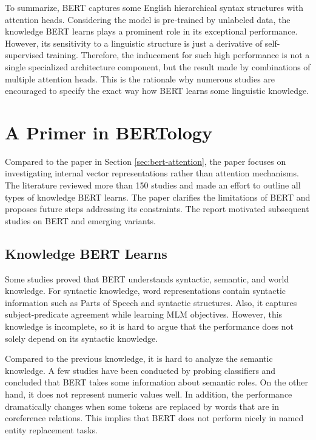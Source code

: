 \documentclass[letterpaper, 11pt]{article}
\begin{document}
To summarize, BERT captures some English hierarchical syntax structures with attention heads. Considering the model is pre-trained by unlabeled data, the knowledge BERT learns plays a prominent role in its exceptional performance. However, its sensitivity to a linguistic structure is just a derivative of self-supervised training. Therefore, the inducement for such high performance is not a single specialized architecture component, but the result made by combinations of multiple attention heads. This is the rationale why numerous studies are encouraged to specify the exact way how BERT learns some linguistic knowledge.


\section{A Primer in BERTology}
\label{sec:bertology}
Compared to the paper in Section \ref{sec:bert-attention}, the paper \citep{rogers-etal-2020-primer} focuses on investigating internal vector representations rather than attention mechanisms. The literature reviewed more than 150 studies and made an effort to outline all types of knowledge BERT learns. The paper clarifies the limitations of BERT and proposes future steps addressing its constraints. The report motivated subsequent studies on BERT and emerging variants.

\subsection{Knowledge BERT Learns}
\label{sec:types-of-info-bert}
Some studies proved that BERT understands syntactic, semantic, and world knowledge. For syntactic knowledge, word representations contain syntactic information such as Parts of Speech and syntactic structures. Also, it captures subject-predicate agreement while learning MLM objectives. However, this knowledge is incomplete, so it is hard to argue that the performance does not solely depend on its syntactic knowledge. 

Compared to the previous knowledge, it is hard to analyze the semantic knowledge. A few studies have been conducted by probing classifiers and concluded that BERT takes some information about semantic roles. On the other hand, it does not represent numeric values well. In addition, the performance dramatically changes when some tokens are replaced by words that are in coreference relations. This implies that BERT does not perform nicely in named entity replacement tasks. 
\end{document}
